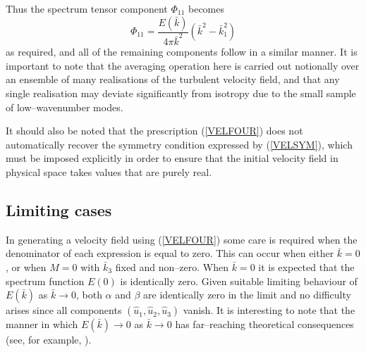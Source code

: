 \documentclass[dvips]{article}
\begin{document}
Thus the spectrum tensor component $\Phi_{11}$ becomes
\[
\Phi_{11} = \frac{E(\bar{k})}{4\pi \bar{k}^{2}}(\bar{k}^{2}-\bar{k}_{1}^{2})
\]
as required, and all of the remaining components follow in a similar manner.
It is important to note that the averaging operation here is carried out
notionally over
an ensemble of many realisations of the turbulent velocity field, and that
any single realisation may deviate significantly from isotropy due to the
small sample of low--wavenumber modes.

It should also be noted that the prescription (\ref{VELFOUR}) does not
automatically recover
the symmetry condition expressed by (\ref{VELSYM}), which must be imposed
explicitly in order to ensure that the initial velocity field in physical
space takes values that are purely real.

\subsection{Limiting cases}
In generating a velocity field using (\ref{VELFOUR}) some care
is required when the denominator of each expression is equal to zero.  This can
occur when either $\bar{k}=0$, or when $M=0$ with $\bar{k}_{3}$ fixed and
non--zero.
When $\bar{k}=0$ it is expected that the spectrum function $E(0)$ is
identically zero.  Given suitable limiting
behaviour of $E(\bar{k})$ as $\bar{k}\rightarrow 0$, both $\alpha$ and $\beta$
are identically zero in the limit and no difficulty arises since all
components $(\hat{u}_{1},\hat{u}_{2},\hat{u}_{3})$ vanish.
It is interesting to note that the manner in which 
$E(\bar{k}) \rightarrow 0$ as $\bar{k} \rightarrow 0$ has far--reaching
theoretical consequences (see, for example, \cite{moninyag}).
\end{document}
